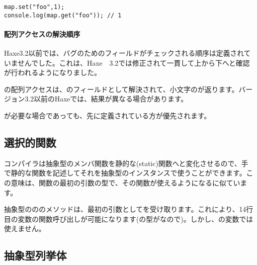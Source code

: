 \begin{lstlisting}
map.set("foo",1);
console.log(map.get("foo")); // 1
\end{lstlisting}

\paragraph{配列アクセスの解決順序}
\label{types-abstract-array-access-order}

Haxe3.2以前では、バグのためのフィールドがチェックされる順序は定義されていませんでした。これは、Haxe　3.2では修正されて一貫して上から下へと確認が行われるようになりました。


の配列アクセスは、のフィールドとして解決されて、小文字のが返ります。バージョン3.2以前のHaxeでは、結果が異なる場合があります。

が必要な場合であっても、先に定義されている方が優先されます。

\subsection{選択的関数}
\label{types-abstract-selective-functions}

コンパイラは抽象型のメンバ関数を静的な(static)関数へと変化させるので、手で静的な関数を記述してそれを抽象型のインスタンスで使うことができます。この意味は、関数の最初の引数の型で、その関数が使えるようになるに似ています。


抽象型のののメソッドは、最初の引数としてを受け取ります。これにより、14行目の変数の関数呼び出しが可能になります(の型がなので)。しかし、の変数では使えません。



\subsection{抽象型列挙体}
\label{types-abstract-enum}

